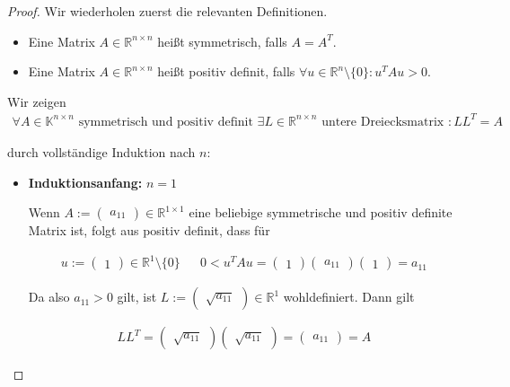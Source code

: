 \documentclass[]{article}
\begin{document}
\begin{proof}
	Wir wiederholen zuerst die relevanten Definitionen.
	
	\begin{itemize}
		\item Eine Matrix $A \in \mathbb{R}^{n\times n}$ heißt symmetrisch, falls $A = A^T$.
		\item Eine Matrix $A \in \mathbb{R}^{n\times n}$ heißt positiv definit, falls $\forall u \in \mathbb{R}^n\setminus\{0\}: u^T A u > 0$.
	\end{itemize}

	Wir zeigen
	\begin{align*}
		\forall A \in \mathbb{K}^{n\times n} \text{ symmetrisch und positiv definit } \exists L \in \mathbb{R}^{n\times n} \text{ untere Dreiecksmatrix } : LL^T=A
	\end{align*}
	
	 durch vollständige Induktion nach $n$:
	
	\begin{itemize}
		\item \textbf{Induktionsanfang:} $n=1$
		
		Wenn $A := \begin{pmatrix}
			a_{11}
		\end{pmatrix} \in \mathbb{R}^{1\times 1}$ eine beliebige symmetrische und positiv definite Matrix ist, folgt aus positiv definit, dass für
	
		\begin{align*}
			u := \begin{pmatrix}
				1
			\end{pmatrix} \in \mathbb{R}^1 \setminus\{0\} && 0 < u^TAu = \begin{pmatrix}
				1
			\end{pmatrix} \begin{pmatrix}
				a_{11}
			\end{pmatrix} \begin{pmatrix}
				1
			\end{pmatrix} = a_{11}
		\end{align*}
	
		Da also $a_{11} > 0$ gilt, ist $L := \begin{pmatrix}
			\sqrt{a_{11}}
		\end{pmatrix} \in \mathbb{R}^{1}$ wohldefiniert. Dann gilt
	
		\begin{align*}
			LL^T = \begin{pmatrix}
				\sqrt{a_{11}}
			\end{pmatrix} \begin{pmatrix}
				\sqrt{a_{11}}
			\end{pmatrix} = \begin{pmatrix}
				a_{11}
			\end{pmatrix} = A
		\end{align*}
	

\end{itemize}
\end{proof}
\end{document}
